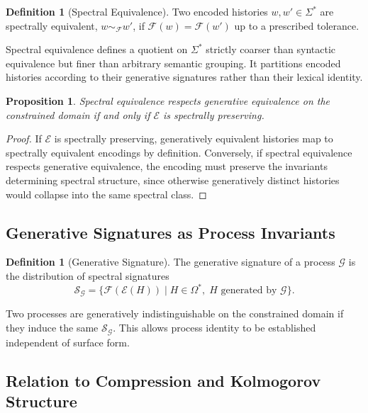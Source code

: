 \documentclass[12pt, a4paper]{article}
\theoremstyle{plain}
\newtheorem{proposition}[theorem]{Proposition}
\theoremstyle{definition}
\newtheorem{definition}[theorem]{Definition}
\theoremstyle{remark}
\begin{document}
\begin{definition}[Spectral Equivalence]
Two encoded histories $w, w' \in \Sigma^*$ are spectrally equivalent, $w \sim_{\mathcal{F}} w'$, if $\mathcal{F}(w) = \mathcal{F}(w')$ up to a prescribed tolerance.
\end{definition}

Spectral equivalence defines a quotient on $\Sigma^*$ strictly coarser than syntactic equivalence but finer than arbitrary semantic grouping. It partitions encoded histories according to their generative signatures rather than their lexical identity.

\begin{proposition}
Spectral equivalence respects generative equivalence on the constrained domain if and only if $\mathcal{E}$ is spectrally preserving.
\end{proposition}

\begin{proof}
If $\mathcal{E}$ is spectrally preserving, generatively equivalent histories map to spectrally equivalent encodings by definition. Conversely, if spectral equivalence respects generative equivalence, the encoding must preserve the invariants determining spectral structure, since otherwise generatively distinct histories would collapse into the same spectral class.
\end{proof}

\subsection{Generative Signatures as Process Invariants}

\begin{definition}[Generative Signature]
The generative signature of a process $\mathcal{G}$ is the distribution of spectral signatures
\[
\mathcal{S}_{\mathcal{G}} = \{ \mathcal{F}(\mathcal{E}(H)) \mid H \in \Omega^*,\; H \text{ generated by } \mathcal{G} \}.
\]
\end{definition}

Two processes are generatively indistinguishable on the constrained domain if they induce the same $\mathcal{S}_{\mathcal{G}}$. This allows process identity to be established independent of surface form.

\subsection{Relation to Compression and Kolmogorov Structure}
\end{document}
